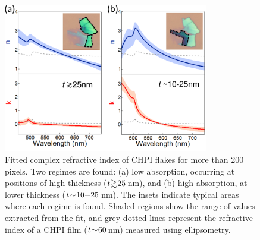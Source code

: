 \begin{figure}[h!]
\centering
\includegraphics[width=0.8\textwidth]{Fig4}
\caption[Fitted complex refractive index of CHPI flakes for more than 200 pixels. Two regimes are found: (a) low absorption, occurring at positions of high thickness ($t\negmedspace\gtrsim\negmedspace25$\,nm), and (b) high absorption, at lower thickness ($t\negmedspace\sim\negmedspace10\negmedspace-\negmedspace25$\,nm).]{Fitted complex refractive index of CHPI flakes for more than 200 pixels. Two regimes are found: (a) low absorption, occurring at positions of high thickness ($t\negmedspace\gtrsim\negmedspace25$\,nm), and (b) high absorption, at lower thickness ($t\negmedspace\sim\negmedspace10\negmedspace-\negmedspace25$\,nm). The insets indicate typical areas where each regime is found. Shaded regions show the range of values extracted from the fit, and grey dotted lines represent the refractive index of a CHPI film ($t\negmedspace\sim\negmedspace60$\,nm) measured using ellipsometry.}
\label{5Fig4}
\end{figure}

